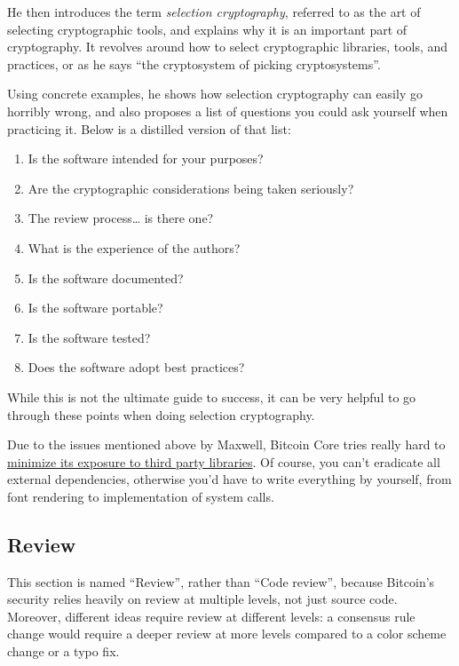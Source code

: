 He then introduces the term \emph{selection cryptography}, referred to
as the art of selecting cryptographic tools, and explains why it is an
important part of cryptography. It revolves around how to select
cryptographic libraries, tools, and practices, or as he says ``the
cryptosystem of picking cryptosystems''.

Using concrete examples, he shows how selection cryptography can easily
go horribly wrong, and also proposes a list of questions you could ask
yourself when practicing it. Below is a distilled version of that list:

\begin{enumerate}
\def\labelenumi{\arabic{enumi}.}
\item
  Is the software intended for your purposes?
\item
  Are the cryptographic considerations being taken seriously?
\item
  The review process\ldots\hspace{0pt} is there one?
\item
  What is the experience of the authors?
\item
  Is the software documented?
\item
  Is the software portable?
\item
  Is the software tested?
\item
  Does the software adopt best practices?
\end{enumerate}

While this is not the ultimate guide to success, it can be very helpful
to go through these points when doing selection cryptography.

Due to the issues mentioned above by Maxwell, Bitcoin Core tries really
hard to
\href{https://github.com/bitcoin/bitcoin/blob/master/doc/dependencies.md}{minimize
its exposure to third party libraries}. Of course, you can't eradicate
all external dependencies, otherwise you'd have to write everything by
yourself, from font rendering to implementation of system calls.

\hypertarget{review}{%
\subsection{Review}\label{review}}

This section is named ``Review'', rather than ``Code review'', because
Bitcoin's security relies heavily on review at multiple levels, not just
source code. Moreover, different ideas require review at different
levels: a consensus rule change would require a deeper review at more
levels compared to a color scheme change or a typo fix.

